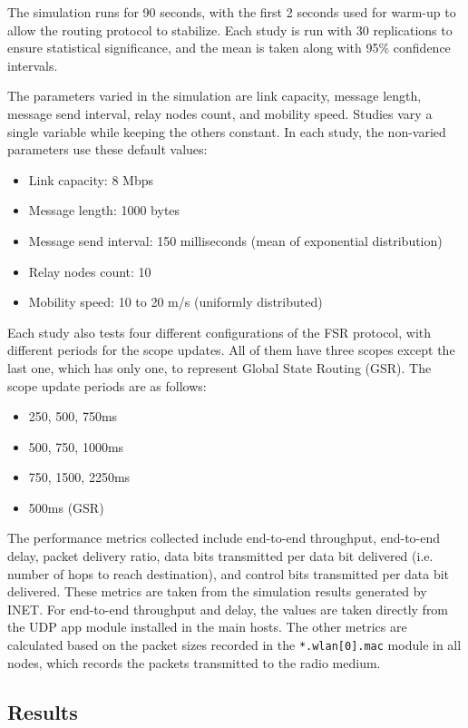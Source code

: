 \documentclass{winslabreport}
\begin{document}
The simulation runs for 90 seconds, with the first 2 seconds used for warm-up to allow the routing protocol to stabilize. Each study is run with 30 replications to ensure statistical significance, and the mean is taken along with 95\% confidence intervals.

The parameters varied in the simulation are link capacity, message length, message send interval, relay nodes count, and mobility speed. Studies vary a single variable while keeping the others constant. In each study, the non-varied parameters use these default values:
\begin{itemize}
    \item Link capacity: 8 Mbps
    \item Message length: 1000 bytes
    \item Message send interval: 150 milliseconds (mean of exponential distribution)
    \item Relay nodes count: 10
    \item Mobility speed: 10 to 20 m/s (uniformly distributed)
\end{itemize}

Each study also tests four different configurations of the FSR protocol, with different periods for the scope updates. All of them have three scopes except the last one, which has only one, to represent Global State Routing (GSR). The scope update periods are as follows:
\begin{itemize}
    \item 250, 500, 750ms
    \item 500, 750, 1000ms
    \item 750, 1500, 2250ms
    \item 500ms (GSR)
\end{itemize}

The performance metrics collected include end-to-end throughput, end-to-end delay, packet delivery ratio, data bits transmitted per data bit delivered (i.e. number of hops to reach destination), and control bits transmitted per data bit delivered. These metrics are taken from the simulation results generated by INET. For end-to-end throughput and delay, the values are taken directly from the UDP app module installed in the main hosts. The other metrics are calculated based on the packet sizes recorded in the \texttt{*.wlan[0].mac} module in all nodes, which records the packets transmitted to the radio medium.

\subsection{Results}
\end{document}
